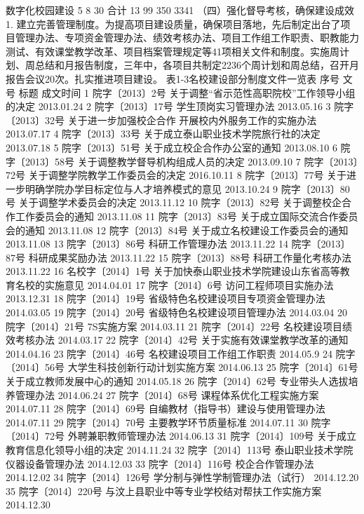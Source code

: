 数字化校园建设
5
8
30
合计
13
99
350
3341
（四）强化督导考核，确保建设成效
1. 建立完善管理制度。为提高项目建设质量，确保项目落地，先后制定出台了项目管理办法、专项资金管理办法、绩效考核办法、项目工作组工作职责、职教能力测试、有效课堂教学改革、项目档案管理规定等41项相关文件和制度。实施周计划、周总结和月报告制度，三年中，各项目共制定2236个周计划和周总结，召开月报告会议20次。扎实推进项目建设。
表1-3名校建设部分制度文件一览表
序号
文号
标题
成文时间
1
院字〔2013〕2号
关于调整“省示范性高职院校”工作领导小组的决定
2013.01.24
2
院字〔2013〕17号
学生顶岗实习管理办法
2013.05.16
3
院字〔2013〕32号
关于进一步加强校企合作 开展校内外服务工作的实施办法
2013.07.17
4
院字〔2013〕33号
关于成立泰山职业技术学院旅行社的决定
2013.07.18
5
院字〔2013〕51号
关于成立校企合作办公室的通知
2013.08.10
6
院字〔2013〕58号
关于调整教学督导机构组成人员的决定
2013.09.10
7
院字〔2013〕72号
关于调整学院教学工作委员会的决定
2016.10.11
8
院字〔2013〕77号
关于进一步明确学院办学目标定位与人才培养模式的意见
2013.10.24
9
院字〔2013〕80号
关于调整学术委员会的决定
2013.11.12
10
院字〔2013〕82号
关于调整校企合作工作委员会的通知
2013.11.08
11
院字〔2013〕83号
关于成立国际交流合作委员会的通知
2013.11.08
12
院字〔2013〕84号
关于成立名校建设工作委员会的通知
2013.11.08
13
院字〔2013〕86号
科研工作管理办法
2013.11.22
14
院字〔2013〕87号
科研成果奖励办法
2013.11.22
15
院字〔2013〕88号
科研工作量化考核办法
2013.11.22
16
名校字〔2014〕1号
关于加快泰山职业技术学院建设山东省高等教育名校的实施意见
2014.04.01
17
院字〔2014〕6号
访问工程师项目实施办法
2013.12.31
18
院字〔2014〕19号
省级特色名校建设项目专项资金管理办法
2014.03.05
19
院字〔2014〕20号
省级特色名校建设项目管理办法
2014.03.04
20
院字〔2014〕21号
7S实施方案
2014.03.11
21
院字〔2014〕22号
名校建设项目绩效考核办法
2014.03.17
22
院字〔2014〕42号
关于实施有效课堂教学改革的通知
2014.04.16
23
院字〔2014〕46号
名校建设项目工作组工作职责
2014.05.9
24
院字〔2014〕56号
大学生科技创新行动计划实施方案
2014.06.13
25
院字〔2014〕61号
关于成立教师发展中心的通知
2014.05.18
26
院字〔2014〕62号
专业带头人选拔培养管理办法
2014.06.24
27
院字〔2014〕68号
课程体系优化工程实施方案
2014.07.11
28
院字〔2014〕69号
自编教材（指导书）建设与使用管理办法
2014.07.11
29
院字〔2014〕70号
主要教学环节质量标准
2014.07.11
30
院字〔2014〕72号
外聘兼职教师管理办法
2014.06.13
31
院字〔2014〕109号
关于成立教育信息化领导小组的决定
2014.11.24
32
院字〔2014〕113号
泰山职业技术学院仪器设备管理办法
2014.12.03
33
院字〔2014〕116号
校企合作管理办法
2014.12.02
34
院字〔2014〕126号
学分制与弹性学制管理办法（试行）
2014.12.20
35
院字〔2014〕220号
与汶上县职业中等专业学校结对帮扶工作实施方案
2014.12.30
